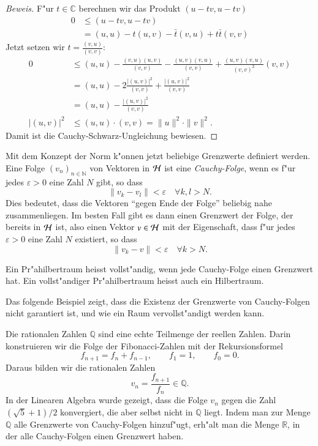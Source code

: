 \begin{proof}[Beweis]
F"ur $t\in\mathbb C$ berechnen wir das Produkt $(u-tv, u-tv)$
\begin{align*}
0&\le (u-tv,u-tv)\\
 &=   (u,u) - t(u,v) - \bar t(v,u) +   t\bar t(v,v) 
\end{align*}
Jetzt setzen wir $t=\frac{(v,u)}{(v,v)}$:
\begin{align*}
0&\le (u,u) - \frac{(v,u)(u,v)}{(v,v)} - \frac{(u,v)(v,u)}{(v,v)} + \frac{(u,v)(v,u)}{(v,v)^2}(v,v)\\
 &=(u,u) - 2\frac{|(u,v)|^2}{(v,v)} +\frac{|(u,v)|^2}{(v,v)}\\
 &=(u,u) -\frac{|(u,v)|^2}{(v,v)}\\
|(u,v)|^2&\le (u,u)\cdot (v,v) = \|u\|^2\cdot \|v\|^2.
\end{align*}
Damit ist die Cauchy-Schwarz-Ungleichung bewiesen.
\end{proof}

Mit dem Konzept der Norm k"onnen jetzt beliebige Grenzwerte 
definiert werden.
Eine Folge $(v_n)_{n\in\mathbb N}$ von Vektoren in $\cal H$ ist eine
{\em Cauchy-Folge}, wenn es f"ur jedes $\varepsilon>0$ eine Zahl
$N$ gibt, so dass
\[
\|v_k-v_l\| <\varepsilon\quad\forall k,l>N.
\]
Dies bedeutet, dass die Vektoren ``gegen Ende der Folge'' beliebig
nahe zusammenliegen. 
Im besten Fall gibt es dann einen Grenzwert der Folge, der bereits in
$\cal H$ ist, also einen Vektor $v\in\cal H$ mit der Eigenschaft,
dass f"ur jedes $\varepsilon > 0$ eine Zahl $N$ existiert, so dass
\[
\|v_k-v\| < \varepsilon\quad\forall k>N.
\]

\begin{definition}
Ein Pr"ahilbertraum heisst vollst"andig, wenn jede Cauchy-Folge einen
Grenzwert hat.
Ein vollst"andiger Pr"ahilbertraum heisst auch ein Hilbertraum.
\end{definition}

Das folgende Beispiel zeigt, dass die Existenz der Grenzwerte von
Cauchy-Folgen nicht garantiert ist, und wie ein Raum vervollst"andigt
werden kann.

\begin{beispiel}
Die rationalen Zahlen $\mathbb Q$ sind eine echte Teilmenge der
reellen Zahlen.
Darin konstruieren wir die Folge der Fibonacci-Zahlen mit der 
Rekursionsformel
\[
f_{n+1}=f_n+f_{n-1},\qquad f_1=1, \qquad f_0=0.
\]
Daraus bilden wir die rationalen Zahlen
\[
v_n=\frac{f_{n+1}}{f_n}\in\mathbb Q.
\]
In der Linearen Algebra wurde gezeigt, dass die Folge $v_n$ gegen
die Zahl $(\sqrt{5}+1)/2$ konvergiert, die aber selbst nicht in
$\mathbb Q$ liegt. Indem man zur Menge $\mathbb Q$ alle Grenzwerte
von Cauchy-Folgen hinzuf"ugt, erh"alt man die Menge $\mathbb R$, in der
alle Cauchy-Folgen einen Grenzwert haben.
\end{beispiel}

